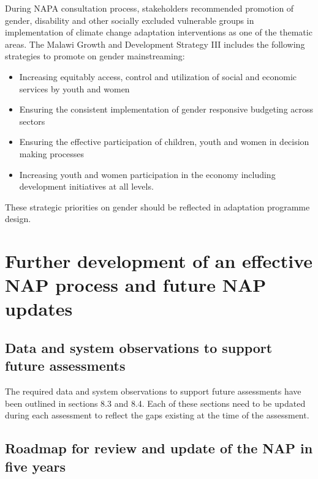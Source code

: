 \documentclass[
]{book}
\providecommand{\tightlist}{%
  \setlength{\itemsep}{0pt}\setlength{\parskip}{0pt}}
\begin{document}
During NAPA consultation process, stakeholders recommended promotion of gender, disability and other socially excluded vulnerable groups in implementation of climate change adaptation interventions as one of the thematic areas. The Malawi Growth and Development Strategy III includes the following strategies to promote on gender mainstreaming:

\begin{itemize}
\tightlist
\item
  Increasing equitably access, control and utilization of social and economic services by youth and women
\item
  Ensuring the consistent implementation of gender responsive budgeting across sectors
\item
  Ensuring the effective participation of children, youth and women in decision making processes
\item
  Increasing youth and women participation in the economy including development initiatives at all levels.
\end{itemize}

These strategic priorities on gender should be reflected in adaptation programme design.

\hypertarget{further-development-of-an-effective-nap-process-and-future-nap-updates}{%
\chapter{Further development of an effective NAP process and future NAP updates}\label{further-development-of-an-effective-nap-process-and-future-nap-updates}}

\hypertarget{data-and-system-observations-to-support-future-assessments}{%
\section{Data and system observations to support future assessments}\label{data-and-system-observations-to-support-future-assessments}}

The required data and system observations to support future assessments have been outlined in sections 8.3 and 8.4. Each of these sections need to be updated during each assessment to reflect the gaps existing at the time of the assessment.

\hypertarget{roadmap-for-review-and-update-of-the-nap-in-five-years}{%
\section{Roadmap for review and update of the NAP in five years}\label{roadmap-for-review-and-update-of-the-nap-in-five-years}}
\end{document}

